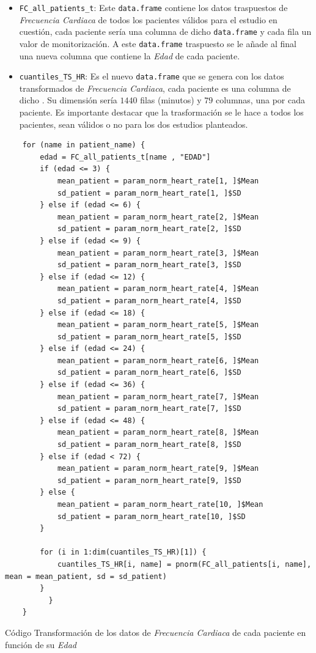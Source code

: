 \begin{itemize}
    \item \texttt{FC\_all\_patients\_t}: Este \texttt{data.frame} contiene los datos traspuestos de \textit{Frecuencia Cardiaca} de todos los pacientes válidos para el estudio en cuestión, cada paciente sería una columna de dicho \texttt{data.frame} y cada fila un valor de monitorización. A este \texttt{data.frame} traspuesto se le añade al final una nueva columna que contiene la \textit{Edad} de cada paciente.
    \item \texttt{cuantiles\_TS\_HR}: Es el nuevo \texttt{data.frame} que se genera con los datos transformados de \textit{Frecuencia Cardiaca}, cada paciente es una columna de dicho . Su dimensión sería $1440$ filas (minutos) y $79$ columnas, una por cada paciente. Es importante destacar que la trasformación se le hace a todos los pacientes, sean válidos o no para los dos estudios planteados. 
\end{itemize}

\begin{code}[H]
    \begin{lstlisting}
    for (name in patient_name) {
        edad = FC_all_patients_t[name , "EDAD"]
        if (edad <= 3) {
            mean_patient = param_norm_heart_rate[1, ]$Mean
            sd_patient = param_norm_heart_rate[1, ]$SD
        } else if (edad <= 6) {
            mean_patient = param_norm_heart_rate[2, ]$Mean
            sd_patient = param_norm_heart_rate[2, ]$SD
        } else if (edad <= 9) {
            mean_patient = param_norm_heart_rate[3, ]$Mean
            sd_patient = param_norm_heart_rate[3, ]$SD
        } else if (edad <= 12) {
            mean_patient = param_norm_heart_rate[4, ]$Mean
            sd_patient = param_norm_heart_rate[4, ]$SD
        } else if (edad <= 18) {
            mean_patient = param_norm_heart_rate[5, ]$Mean
            sd_patient = param_norm_heart_rate[5, ]$SD
        } else if (edad <= 24) {
            mean_patient = param_norm_heart_rate[6, ]$Mean
            sd_patient = param_norm_heart_rate[6, ]$SD
        } else if (edad <= 36) {
            mean_patient = param_norm_heart_rate[7, ]$Mean
            sd_patient = param_norm_heart_rate[7, ]$SD
        } else if (edad <= 48) {
            mean_patient = param_norm_heart_rate[8, ]$Mean
            sd_patient = param_norm_heart_rate[8, ]$SD
        } else if (edad < 72) {
            mean_patient = param_norm_heart_rate[9, ]$Mean
            sd_patient = param_norm_heart_rate[9, ]$SD
        } else {
            mean_patient = param_norm_heart_rate[10, ]$Mean
            sd_patient = param_norm_heart_rate[10, ]$SD
        }
        
        for (i in 1:dim(cuantiles_TS_HR)[1]) {
            cuantiles_TS_HR[i, name] = pnorm(FC_all_patients[i, name], mean = mean_patient, sd = sd_patient)
        }
          }
    }
    \end{lstlisting}
    \caption{Código Transformación de los datos de \textit{Frecuencia Cardiaca} de cada paciente en función de su \textit{Edad}}
    \label{cod:transformación-frecuencia-cardiaca}
\end{code}


